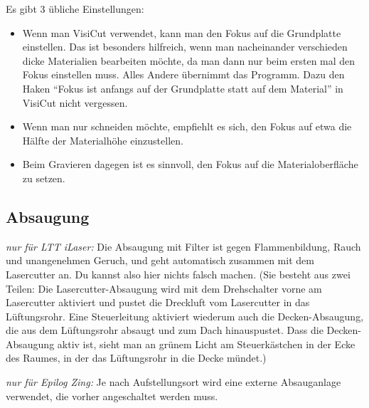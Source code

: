 \documentclass{\basedir/fablab-document}
\newcommand{\knopf}[2]{
	\begin{tikzpicture}[baseline={(box.base)}]
	\node [#1] (box) {
		\fontsize{9pt}{9pt}\selectfont \textbf{#2}\strut
	};
	\end{tikzpicture}
}
\newcommand{\nurZing}{\emph{nur für Epilog Zing:} }
\newcommand{\nurLTT}{\emph{nur für LTT iLaser:} }
\newcommand{\lueftungKnopf}[1]{\knopf{lueftungsknopf}{#1}}
\newcommand{\reflectboxX}[1]{\raisebox{\depth}{\scalebox{1}[-1]{#1}}} %
\newcommand{\returnSymbol}{\reflectboxX{\ensuremath{\mathbf{\Lsh}}}} %
\newcommand{\lueftungEnter}{\lueftungKnopf{\returnSymbol}}
\newcommand{\lueftungMinus}{\lueftungKnopf{-}}
\newcommand{\lueftungPlus}{\lueftungKnopf{+}}
\newcommand{\lueftungOn}{\lueftungKnopf{On}}
\newcommand{\lueftungOff}{\lueftungKnopf{Off}}
\begin{document}
	Es gibt 3 übliche Einstellungen:
	\begin{itemize}
		\item Wenn man VisiCut verwendet, kann man den Fokus auf die Grundplatte einstellen. Das ist besonders hilfreich, wenn man nacheinander verschieden dicke Materialien bearbeiten möchte, da man dann nur beim ersten mal den Fokus einstellen muss. Alles Andere übernimmt das Programm. Dazu den Haken ``Fokus ist anfangs auf der Grundplatte statt auf dem Material'' in VisiCut nicht vergessen.
		\item Wenn man nur schneiden möchte, empfiehlt es sich, den Fokus auf etwa die Hälfte der Materialhöhe einzustellen.
		\item Beim Gravieren dagegen ist es sinnvoll, den Fokus auf die Materialoberfläche zu setzen.
	\end{itemize}



	\subsection{Absaugung}
	\label{sec:absaugung}

	\nurLTT Die Absaugung mit Filter ist gegen Flammenbildung, Rauch und unangenehmen Geruch, und geht automatisch zusammen mit dem Lasercutter an. Du kannst also hier nichts falsch machen. (Sie besteht aus zwei Teilen: Die Lasercutter-Absaugung wird mit dem Drehschalter vorne am Lasercutter aktiviert und pustet die Dreckluft vom Lasercutter in das Lüftungsrohr. Eine Steuerleitung aktiviert wiederum auch die Decken-Absaugung, die aus dem Lüftungsrohr absaugt und zum Dach hinauspustet. Dass die Decken-Absaugung aktiv ist, sieht man an grünem Licht am Steuerkästchen in der Ecke des Raumes, in der das Lüftungsrohr in die Decke mündet.)

	\nurZing Je nach Aufstellungsort wird eine externe Absauganlage verwendet, die vorher angeschaltet werden muss.

\end{document}
